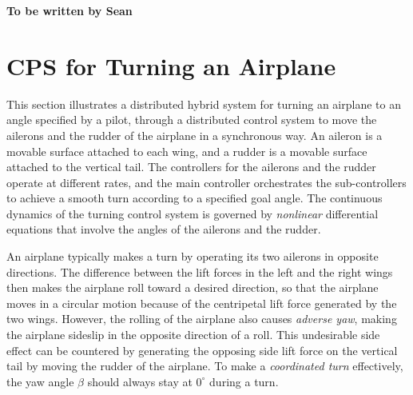 \documentclass{sig-alternate}
\begin{document}
\textbf{To be written by Sean}
\newpage


\section{CPS for Turning an Airplane}

This section illustrates a distributed hybrid system
for turning an airplane to an angle specified by a pilot,
through a distributed control system to move the ailerons and the rudder 
of the airplane
in a synchronous way.
An aileron is a movable surface attached to  each wing, and a rudder is a movable surface attached to the vertical tail.
%
The controllers 
for the ailerons and the rudder operate at different rates,
and the main controller orchestrates the sub-controllers 
to achieve a smooth turn
according to a specified goal angle.
%
The continuous dynamics of the turning control system
is governed by \emph{nonlinear} differential equations
that involve the angles of the ailerons and the rudder.




An airplane typically makes a turn by operating its two ailerons in opposite directions.
The difference between the lift forces in the left and the right wings
then makes the airplane roll toward a desired direction, 
so that the airplane moves in a circular motion 
because of  the centripetal lift force 
generated by the two wings.
However, the rolling of the airplane also causes
\emph{adverse yaw}, making the airplane sideslip in the opposite direction of a roll.
This undesirable side effect can be countered by 
generating the opposing side lift force on the vertical tail
by moving the rudder of the airplane.
To make a \emph{coordinated turn} effectively, the yaw angle $\beta$ should
always stay at $0^\circ$
during a turn.
\end{document}

